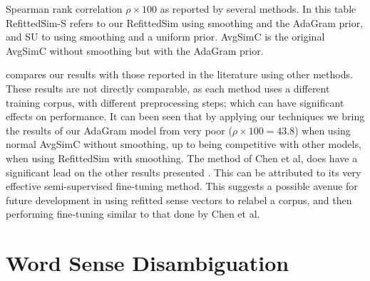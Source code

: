 \documentclass{sig-alternate}
\begin{document}
\begin{table}
	\begin{adjustbox}{max width=\columnwidth}
	\end{adjustbox}
	\caption{Spearman rank correlation $\rho \times 100$  as reported by several methods\label{swscEvery}. In this table RefittedSim-S refers to our RefittedSim using smoothing and the AdaGram prior, and SU to using smoothing and a uniform prior. AvgSimC is the original AvgSimC without smoothing but with the AdaGram prior.}
\end{table}

 compares our results with those reported in the literature using other methods. These results are not directly comparable, as each method uses a different training corpus, with different preprocessing steps;  which can have significant effects on performance.
It can been seen that by applying our techniques we bring the results of our AdaGram model from very poor ($\rho \times 100 = 43.8$) when using normal AvgSimC without smoothing, up to being competitive with other models, when using RefittedSim with smoothing. The method of Chen et al, does have a significant lead on the other results presented \parencite{Chen2014}. This can be attributed to its very effective semi-supervised fine-tuning method. This suggests a possible avenue for future development in using refitted sense vectors to  relabel a corpus, and then performing fine-tuning similar to that done by Chen et al.



\section{Word Sense Disambiguation}\label{lexicalWSD}
\end{document}
